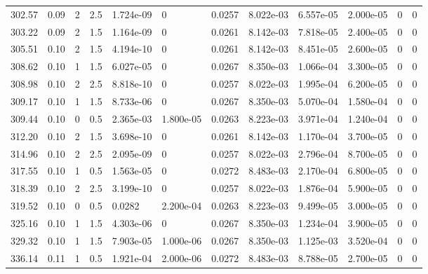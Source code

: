 \documentclass[preview]{standalone}
\begin{document}
{{\begin{tabular}{L{1.2cm}C{1.2cm} C{0.3cm}C{0.5cm} C{1.4cm}C{1.4cm} C{1.4cm}C{1.4cm} C{1.6cm}C{1.6cm} C{1.6cm}C{1.6cm}}
  302.57  &  0.09  & 2     & 2.5 &  1.724e-09  & 0  &  0.0257&   8.022e-03& 6.557e-05 & 2.000e-05   &  0 & 0  \\ 
  303.22  &  0.09  & 2     & 1.5 &  1.164e-09  & 0  &  0.0261&   8.142e-03& 7.818e-05 & 2.400e-05   &  0 & 0  \\ 
  305.51  &  0.10  & 2     & 1.5 &  4.194e-10  & 0  &  0.0261&   8.142e-03& 8.451e-05 & 2.600e-05   &  0 & 0  \\ 
  308.62  &  0.10  & 1     & 1.5 &  6.027e-05  & 0  &  0.0267&   8.350e-03& 1.066e-04 & 3.300e-05   &  0 & 0  \\ 
  308.98  &  0.10  & 2     & 2.5 &  8.818e-10  & 0  &  0.0257&   8.022e-03& 1.995e-04 & 6.200e-05   &  0 & 0  \\ 
  309.17  &  0.10  & 1     & 1.5 &  8.733e-06  & 0  &  0.0267&   8.350e-03& 5.070e-04 & 1.580e-04   &  0 & 0  \\ 
  309.44  &  0.10  & 0     & 0.5 &  2.365e-03  & 1.800e-05  &  0.0263&   8.223e-03& 3.971e-04 & 1.240e-04   &  0 & 0  \\ 
  312.20  &  0.10  & 2     & 1.5 &  3.698e-10  & 0  &  0.0261&   8.142e-03& 1.170e-04 & 3.700e-05   &  0 & 0  \\ 
  314.96  &  0.10  & 2     & 2.5 &  2.095e-09  & 0  &  0.0257&   8.022e-03& 2.796e-04 & 8.700e-05   &  0 & 0  \\ 
  317.55  &  0.10  & 1     & 0.5 &  1.563e-05  & 0  &  0.0272&   8.483e-03& 2.170e-04 & 6.800e-05   &  0 & 0  \\ 
  318.39  &  0.10  & 2     & 2.5 &  3.199e-10  & 0  &  0.0257&   8.022e-03& 1.876e-04 & 5.900e-05   &  0 & 0  \\ 
  319.52  &  0.10  & 0     & 0.5 &  0.0282  & 2.200e-04  &  0.0263&   8.223e-03& 9.499e-05 & 3.000e-05   &  0 & 0  \\ 
  325.16  &  0.10  & 1     & 1.5 &  4.303e-06  & 0  &  0.0267&   8.350e-03& 1.234e-04 & 3.900e-05   &  0 & 0  \\ 
  329.32  &  0.10  & 1     & 1.5 &  7.903e-05  & 1.000e-06  &  0.0267&   8.350e-03& 1.125e-03 & 3.520e-04   &  0 & 0  \\ 
  336.14  &  0.11  & 1     & 0.5 &  1.921e-04  & 2.000e-06  &  0.0272&   8.483e-03& 8.788e-05 & 2.700e-05   &  0 & 0  \\ 
\hline 
\end{tabular} 

}}
\end{document}
